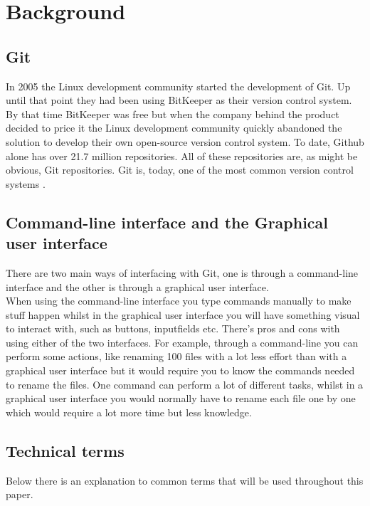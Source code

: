 \documentclass[12pt,a4paper,article,compsoc]{IEEEtran}
\begin{document}
		\section{Background}
			\subsection{Git}
			In 2005 the Linux development community started the development of Git.
			Up until that point they had been using BitKeeper as their version control system. By that time BitKeeper was free but when the company behind the product decided to price it the Linux development community quickly abandoned the solution to develop their own open-source version control system.\cite{ProGit}
			To date, Github alone has over 21.7 million repositories.\cite{GithubAbout} All of these repositories are, as might be obvious, Git repositories. 
			Git is, today, one of the most common version control systems \cite{EclipseDeveoperReport}\cite{DeveloperProductivity}\cite{MicrosoftSurveyResults}.
			
			\subsection{Command-line interface and the Graphical user interface}
			There are two main ways of interfacing with Git, one is through a command-line interface and the other is through a graphical user interface.\\
			When using the command-line interface you type commands manually to make stuff happen whilst in the graphical user interface you will have something visual to interact with, such as buttons, inputfields etc.
			There's pros and cons with using either of the two interfaces.
			For example, through a command-line you can perform some actions, like renaming 100 files with a lot less effort than with a graphical user interface but it would require you to know the commands needed to rename the files. One command can perform a lot of different tasks, whilst in a graphical user interface you would normally have to rename each file one by one which would require a lot more time but less knowledge.
			
			\subsection{Technical terms}
			Below there is an explanation to common terms that will be used throughout this paper.
			
\end{document}
